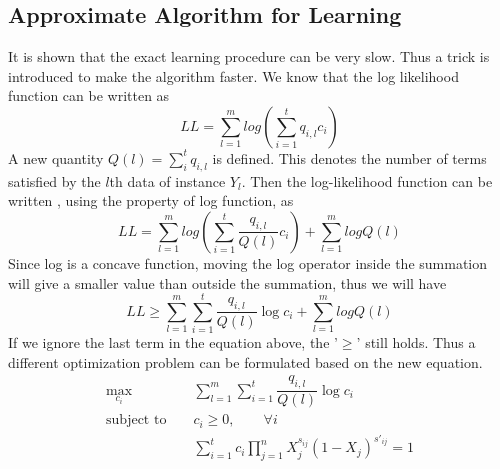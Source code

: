 \documentclass[11pt]{article}
\begin{document}
\subsection{Approximate Algorithm for Learning}
It is shown that the exact learning procedure can be very slow. Thus a trick is introduced to make the algorithm faster. We know that the log likelihood function can be written as 
\[LL=\sum\limits_{l=1}^{m}log(\sum\limits_{i=1}^{t}q_{i,l}c_i)\]
A new quantity $Q(l)=\sum\limits_{i}^{t}q_{i,l}$ is defined. This denotes the number of terms satisfied by the $l$th data of instance $Y_l$. Then the log-likelihood function can be written , using the property of log function, as 
\begin{equation}
LL=\sum\limits_{l=1}^{m}log(\sum\limits_{i=1}^{t}\dfrac{q_{i,l}}{Q(l)}c_i)+\sum\limits_{l=1}^{m}logQ(l)
\end{equation}
Since log is a concave function, moving the log operator inside the summation will give a smaller value than outside the summation, thus we will have 
\begin{equation*}
LL \geq \sum\limits_{l=1}^{m}\sum\limits_{i=1}^{t}\dfrac{q_{i,l}}{Q(l)}\log{c_i}+\sum\limits_{l=1}^{m}logQ(l)
\end{equation*}
If we ignore the last term in the equation above, the '$\geq$' still holds. Thus a different optimization problem can be formulated based on the new equation. 
\begin{eqnarray}
	\max_{c_i} & & \sum\limits_{l=1}^{m}\sum\limits_{i=1}^{t}\dfrac{q_{i,l}}{Q(l)}\log{c_i}  \label{eq:lin_prog_discriminant_obj}\\
	\textrm{subject to } & & c_i\geq 0, \qquad \forall i \label{eq:lin_prog_discriminant_constraint}\\
	& & \sum\limits_{i=1}^{t}c_i\prod\limits_{j=1}^{n}X_j^{s_{ij}}{(1-X_j)}^{s'_{ij}}=1 \label{eq:lin_prog_discriminant_bound}
\end{eqnarray}
\end{document}
